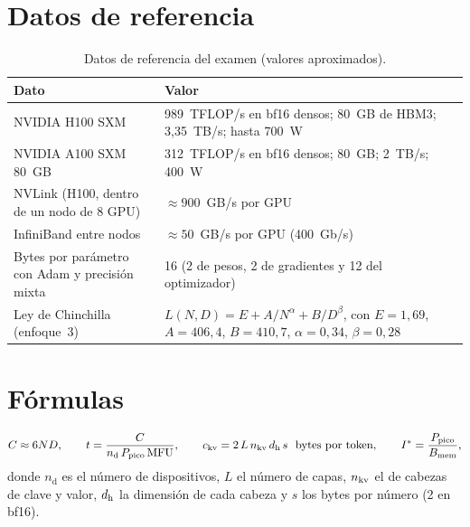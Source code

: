 \section*{Datos de referencia}
\begin{table}[h]
\centering\small
\caption{Datos de referencia del examen (valores aproximados).}\label{tab:datos}
\begin{tabularx}{\textwidth}{@{}lX@{}}
\toprule
Dato & Valor \\
\midrule
NVIDIA H100 SXM & 989~TFLOP/s en bf16 densos; 80~GB de HBM3; 3{,}35~TB/s; hasta 700~W \\
NVIDIA A100 SXM 80~GB & 312~TFLOP/s en bf16 densos; 80~GB; 2~TB/s; 400~W \\
NVLink (H100, dentro de un nodo de 8 GPU) & $\approx 900$~GB/s por GPU \\
InfiniBand entre nodos & $\approx 50$~GB/s por GPU (400~Gb/s) \\
Bytes por parámetro con Adam y precisión mixta & 16 (2 de pesos, 2 de gradientes y 12 del optimizador) \\
Ley de Chinchilla (enfoque~3) & $L(N,D)=E+A/N^{\alpha}+B/D^{\beta}$, con $E=1{,}69$, $A=406{,}4$, $B=410{,}7$, $\alpha=0{,}34$, $\beta=0{,}28$ \\
\bottomrule
\end{tabularx}
\end{table}

\section*{Fórmulas}
\[
C\approx 6ND,\qquad
t=\frac{C}{n_{\mathrm{d}}\,P_{\mathrm{pico}}\,\mathrm{MFU}},\qquad
c_{\mathrm{kv}}=2\,L\,n_{\mathrm{kv}}\,d_{\mathrm{h}}\,s\ \ \text{bytes por token},\qquad
I^{\ast}=\frac{P_{\mathrm{pico}}}{B_{\mathrm{mem}}},
\]
donde $n_{\mathrm{d}}$ es el número de dispositivos, $L$ el número de capas, $n_{\mathrm{kv}}$ el de cabezas de clave y valor, $d_{\mathrm{h}}$ la dimensión de cada cabeza y $s$ los bytes por número (2 en bf16).
